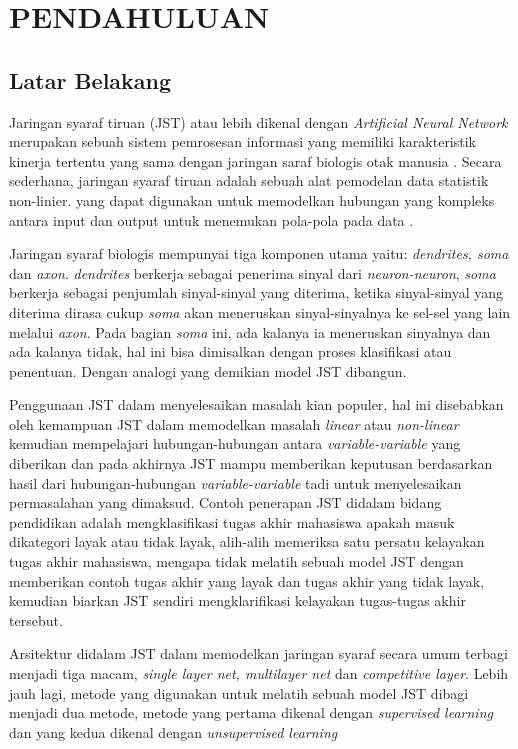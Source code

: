 
\chapter{PENDAHULUAN}

\section{Latar Belakang}
Jaringan syaraf tiruan (JST) atau lebih dikenal dengan \textit{Artificial Neural Network} merupakan sebuah sistem pemrosesan informasi yang memiliki karakteristik kinerja tertentu yang sama dengan jaringan saraf biologis otak manusia \cite{fausett1994fundamentals}. Secara sederhana, jaringan syaraf tiruan adalah sebuah alat pemodelan data statistik non-linier. yang dapat digunakan untuk memodelkan hubungan yang kompleks antara input dan output untuk menemukan pola-pola pada data \cite{wikipedia}. \par
Jaringan syaraf biologis mempunyai tiga komponen utama yaitu: \textit{dendrites, soma} dan \textit{axon}. \textit{dendrites} berkerja sebagai penerima sinyal dari \textit{neuron-neuron}, \textit{soma} berkerja sebagai penjumlah sinyal-sinyal yang diterima, ketika sinyal-sinyal yang diterima dirasa cukup \textit{soma} akan meneruskan sinyal-sinyalnya ke sel-sel yang lain melalui \textit{axon}. Pada bagian \textit{soma} ini, ada kalanya ia meneruskan sinyalnya dan ada kalanya tidak, hal ini bisa dimisalkan dengan proses klasifikasi atau penentuan\cite{fausett1994fundamentals}. Dengan analogi yang demikian model JST dibangun. \par
Penggunaan JST dalam menyelesaikan masalah kian populer, hal ini disebabkan oleh kemampuan JST dalam memodelkan masalah \textit{linear} atau \textit{non-linear} kemudian mempelajari hubungan-hubungan antara \textit{variable-variable} yang diberikan dan pada akhirnya JST mampu memberikan keputusan berdasarkan hasil dari hubungan-hubungan \textit{variable-variable} tadi untuk menyelesaikan permasalahan yang dimaksud. Contoh penerapan JST didalam bidang pendidikan adalah mengklasifikasi tugas akhir mahasiswa apakah masuk dikategori layak atau tidak layak, alih-alih memeriksa satu persatu kelayakan tugas akhir mahasiswa, mengapa tidak melatih sebuah model JST dengan memberikan contoh tugas akhir yang layak dan tugas akhir yang tidak layak, kemudian biarkan JST sendiri mengklarifikasi kelayakan tugas-tugas akhir tersebut. \par 
Arsitektur didalam JST dalam memodelkan jaringan syaraf secara umum terbagi menjadi tiga macam, \textit{single layer net, multilayer net} dan \textit{competitive layer}. Lebih jauh lagi, metode yang digunakan untuk melatih sebuah model JST dibagi menjadi dua metode, metode yang pertama dikenal dengan \textit{supervised learning} dan yang kedua dikenal dengan  \textit{unsupervised learning} \cite{haykin2009neural}



